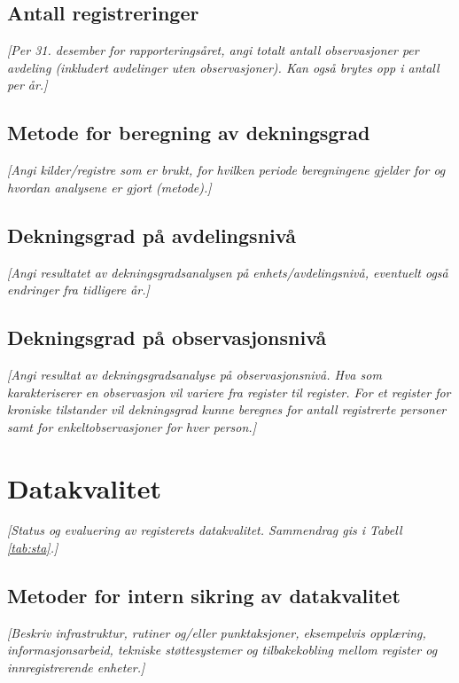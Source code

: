 \documentclass[norsk, a4paper, twocolumn]{report}
\newcommand{\guide}[1] {
	\textit{[\textcolor{guidegray}{#1}]}
	}
\begin{document}
\section{Antall registreringer}\label{sec:reg}
\guide{Per 31. desember for rapporteringsåret, angi totalt antall
observasjoner per avdeling (inkludert avdelinger uten observasjoner). Kan
også brytes opp i antall per år.}

\section{Metode for beregning av dekningsgrad}\label{sec:met}
\guide{Angi kilder/registre som er brukt, for hvilken periode beregningene
gjelder for og hvordan analysene er gjort (metode).}

\section{Dekningsgrad på avdelingsnivå}\label{sec:endek}
\guide{Angi resultatet av dekningsgradsanalysen på enhets/avdelingsnivå,
eventuelt også endringer fra tidligere år.}


\section{Dekningsgrad på observasjonsnivå}\label{sec:obs}
\guide{Angi resultat av dekningsgradsanalyse på observasjonsnivå. Hva som
karakteriserer en observasjon vil variere fra register til register. For et
register for kroniske tilstander vil dekningsgrad kunne beregnes for
antall registrerte personer samt for enkeltobservasjoner for hver person.}

\chapter{Datakvalitet}\label{cha:kva}
\guide{Status og evaluering av registerets  datakvalitet. Sammendrag
gis i Tabell \ref{tab:sta}.}

\section{Metoder for intern sikring av datakvalitet}\label{sec:sik}
\guide{Beskriv infrastruktur, rutiner og/eller punktaksjoner, eksempelvis
opplæring, informasjonsarbeid, tekniske støttesystemer og tilbakekobling mellom
register og innregistrerende enheter.}
\end{document}
